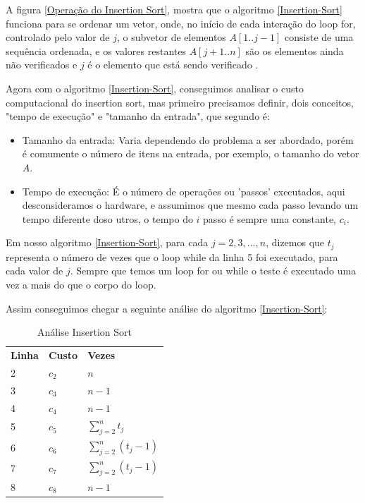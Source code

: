 \documentclass[
    12pt,               %
    openright,          %
    oneside,            %
    a4paper,            %
    english,            %
    brazil              %
    ]{abntex2}
\begin{document}
A figura \ref{Operação do Insertion Sort}, mostra que o algoritmo \ref{Insertion-Sort} funciona para se ordenar um vetor,
onde, no início de cada interação do loop for, controlado pelo valor de $j$, o subvetor de elementos $A[1..j-1]$ consiste
de uma sequência ordenada, e os valores restantes $A[j+1..n]$ são os elementos ainda não verificados e $j$ é o elemento
que está sendo verificado \cite{introductionAlgorthms}.

Agora com o algoritmo \ref{Insertion-Sort}, conseguimos analisar o custo computacional do insertion sort, mas primeiro
precisamos definir, dois conceitos, "tempo de execução" e "tamanho da entrada", que segundo \cite{introductionAlgorthms} é:

\begin{itemize}
    \item Tamanho da entrada: Varia dependendo do problema a ser abordado, porém é comumente o número de itens na entrada,
    por exemplo, o tamanho do vetor $A$.
    \item Tempo de execução: É o número de operações ou 'passos' executados, aqui desconsideramos o hardware, e assumimos
    que mesmo cada passo levando um tempo diferente doso utros, o tempo do $i$ passo é sempre uma constante, $c_i$.  
\end{itemize}

Em nosso algoritmo \ref{Insertion-Sort}, para cada $j = 2, 3, ..., n$, dizemos que $t_j$ representa o número de vezes que
o loop while da linha 5 foi executado, para cada valor de $j$. Sempre que temos um loop for ou while o teste é
executado uma vez a mais do que o corpo do loop.

Assim conseguimos chegar a seguinte análise do algoritmo \ref{Insertion-Sort}:

\begin{table}[H]
    \centering
    \caption{\label{Análise-Insertion-Sort} Análise Insertion Sort}
    \begin{tabular}{lll}
        \textbf{Linha} & \textbf{Custo} & \textbf{Vezes} \\
        2 & $c_2$ & $n$ \\
        3 & $c_3$ & $n-1$ \\
        4 & $c_4$ & $n-1$ \\
        5 & $c_5$ & $\sum_{j=2}^{n} t_j$ \\
        6 & $c_6$ & $\sum_{j=2}^{n} (t_j - 1)$ \\
        7 & $c_7$ & $\sum_{j=2}^{n} (t_j - 1)$ \\
        8 & $c_8$ & $n-1$ \\
    \end{tabular}
\end{table}
\end{document}
